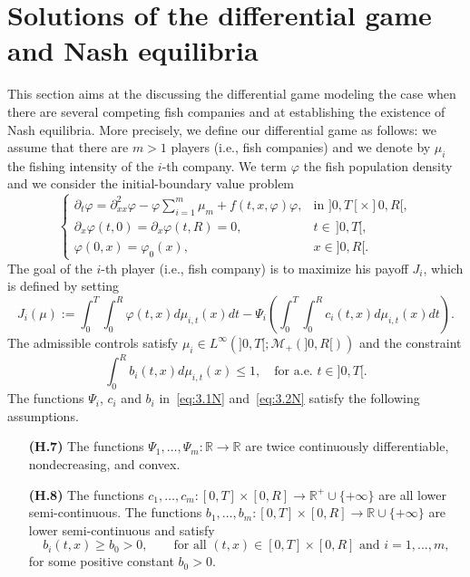 \documentclass[11pt,leqno]{amsart}
\numberwithin{equation}{section}
\begin{document}
\section{Solutions of the differential game and Nash equilibria}
\label{sec:7}
This section aims at the discussing the differential game modeling the case when there are several competing fish companies and at establishing the existence of Nash equilibria. 
More precisely, we define our differential game as follows: we assume that there are $m>1$ players (i.e., fish companies) and we denote by $\mu_i$ the fishing intensity of the $i$-th company. We term ${\varphi}$ the fish population density and we consider the initial-boundary value problem 
\begin{equation}
\label{eq:2N}
\begin{cases}
 {\partial_t}{\varphi} = {\partial_{xx}^2}{\varphi} - {\varphi} \displaystyle{\sum_{i=1}^m} \mu_m + f(t,x,{\varphi}) {\varphi},
    & \text{in $]0, T[ \times ]0, R[$},
    \\
      {\partial_x } {\varphi}(t,0)={\partial_x }{\varphi}(t,R) = 0, & t \in \, ]0, T[,
     \\
    {\varphi}(0,x)={\varphi}_0(x), 
    & x\in{]0,R[}. \phantom{\displaystyle{\int}}
  \end{cases}
\end{equation}
The goal of the $i$-th player (i.e., fish company) is to maximize his payoff $J_i$, which is defined by setting
\begin{equation}
\label{eq:3.1N}
J_i(\mu):=\int_0^T \! \! 
\int_0^R {\varphi}(t,x) d\mu_{i,t}(x)dt-\Psi_i\left(\int_0^T  \! \!  \int_0^R c_i(t,x)d\mu_{i,t}(x)dt\right). 
\end{equation}
The admissible controls satisfy $\mu_i \in L^\infty(]0,T[; {\mathcal M}_+(]0,R[))$ and the constraint 
\begin{equation}
\label{eq:3.2N}
\int_0^R b_i(t,x)d\mu_{i,t}(x)  \leq 1, \quad \text{for a.e. $t \in ]0, T[$}.
\end{equation}
The functions $\Psi_i$, $c_i$ and $b_i$ in~\eqref{eq:3.1N} and~\eqref{eq:3.2N}  satisfy the following assumptions. 
\begin{itemize}
\item[{\bf (H.7)}]
\label{h:accasette} 
The functions $\Psi_1, \dots,\Psi_m: {\mathbb{R}} \to {\mathbb{R}}$ are twice continuously differentiable, nondecreasing, and convex. 
\item[{\bf (H.8)}]
\label{h:accaotto}
The functions $c_1, \dots ,c_m: [0,T]\times[0,R] \to {\mathbb{R}}^+ \cup \{ + \infty \}$  are all lower semi-continuous. The functions $b_1, \dots ,b_m: [0,T]\times[0,R] \to {\mathbb{R}} \cup \{ + \infty \}$ are lower semi-continuous and satisfy
\begin{equation}
\label{eq:3.3N}
b_i(t,x) \ge b_0>0, \qquad \text{for all $(t,x)\in [0,T]\times[0,R]$ and $i=1,...,m$},
\end{equation}
for some positive constant $b_0> 0$.
\end{itemize}
\end{document}
